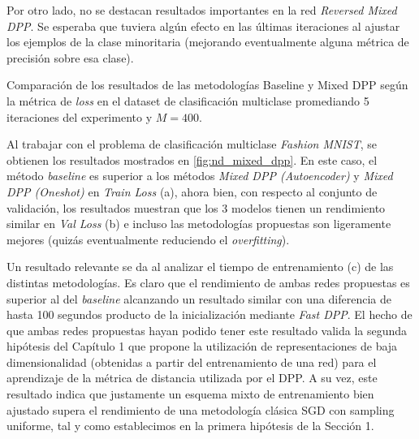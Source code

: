 \vspace{0.2cm}

Por otro lado, no se destacan resultados importantes en la red \textit{Reversed Mixed DPP}. Se esperaba que tuviera algún efecto en las últimas iteraciones al ajustar los ejemplos de la clase minoritaria (mejorando eventualmente alguna métrica de precisión sobre esa clase). 

\begin{images}[\label{fig:nd_mixed_dpp}]{\centering Comparación de los resultados de las metodologías Baseline y Mixed DPP según la métrica de \textit{loss} en el dataset de clasificación multiclase promediando 5 iteraciones del experimento y $M=400$.}

\end{images}


Al trabajar con el problema de clasificación multiclase \textit{Fashion MNIST}, se obtienen los resultados mostrados en \ref{fig:nd_mixed_dpp}. En este caso, el método \textit{baseline} es superior a los métodos \textit{Mixed DPP (Autoencoder)} y \textit{Mixed DPP (Oneshot)} en \textit{Train Loss} (a), ahora bien, con respecto al conjunto de validación, los resultados muestran que los 3 modelos tienen un rendimiento similar en \textit{Val Loss} (b) e incluso las metodologías propuestas son ligeramente mejores (quizás eventualmente reduciendo el \textit{overfitting}).

\vspace{0.2cm}

Un resultado relevante se da al analizar el tiempo de entrenamiento (c) de las distintas metodologías. Es claro que el rendimiento de ambas redes propuestas es superior al del \textit{baseline} alcanzando un resultado similar con una diferencia de hasta 100 segundos producto de la inicialización mediante \textit{Fast DPP}. El hecho de que ambas redes propuestas hayan podido tener este resultado valida la segunda hipótesis del Capítulo 1 que propone la utilización de representaciones de baja dimensionalidad (obtenidas a partir del entrenamiento de una red) para el aprendizaje de la métrica de distancia utilizada por el DPP. A su vez, este resultado indica que justamente un esquema mixto de entrenamiento bien ajustado supera el rendimiento de una metodología clásica SGD con sampling uniforme, tal y como establecimos en la primera hipótesis de la Sección 1. 

